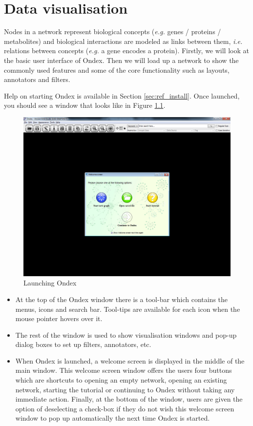 \chapter{Data visualisation}
\label{cha:visualisation}
Nodes in a network represent biological concepts ({\it{e.g.}} genes / proteins / metabolites) and biological interactions are modeled as links between them, {\it{i.e.}} relations between concepts ({\it{e.g.}} a gene encodes a protein).
Firstly, we will look at the basic user interface of Ondex.
Then we will load up a network to show the commonly used features and some of the core functionality such as layouts, annotators and filters. 

Help on starting Ondex is available in Section \ref{sec:ref_install}.
Once launched, you should see a window that looks like in Figure \ref{fig:launch_Ondex}.

\begin{figure}[H]
\centering
\includegraphics[scale=0.3]{images/Jun12/launched_Ondex.png}
\caption{Launching Ondex}
\label{fig:launch_Ondex}
\end{figure}

\begin{itemize}
\item At the top of the Ondex window there is a tool-bar which contains the menus, icons and search bar. 
Tool-tips are available for each icon when the mouse pointer hovers over it.
\item The rest of the window is used to show visualisation windows and pop-up dialog boxes to set up filters, annotators, etc.
\item When Ondex is launched, a welcome screen is displayed in the middle of the main window. 
This welcome screen window offers the users four buttons which are shortcuts to opening an empty network, opening an existing network, starting the tutorial or continuing to Ondex without taking any immediate action. 
Finally, at the bottom of the window, users are given the option of deselecting a check-box if they do not wish this welcome screen window to pop up automatically the next time Ondex is started.
\end{itemize}

